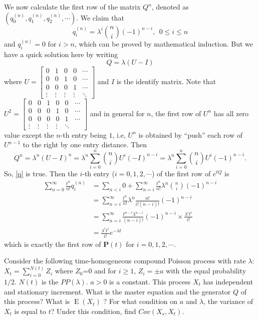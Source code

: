 \documentclass[  11pt]{article}
\newcommand{\e}{ \operatorname{E}}
\newcommand{\Pm}{{\mathbf{P}}}
\begin{document}
\begin{ExerciseList}
We now calculate the first row of the matrix $Q^n$, denoted as
$(q^{(n)}_0,q^{(n)}_1,q^{(n)}_2,\cdots)$. We claim that
\begin{equation}\label{q}
q^{(n)}_i = \lambda^i {n \choose i}(-1)^{n-i}, ~~0\leq i \leq n \tag{$\star$}
\end{equation}
and $q^{(n)}_i=0$  for $ i >n$, which can be proved by mathematical induction. But we have a quick solution here by writing 
\[Q= \lambda(  U-I)\] where $U=\begin{bmatrix}
0 & 1 & 0 & 0 & \cdots \\
0 & 0 & 1 & 0 & \cdots \\
0 & 0 &0&  1  & \cdots \\
\vdots & \vdots & \vdots & \vdots & \ddots
\end{bmatrix}
$ and $I$ is the identify matrix. Note that $U^2=\begin{bmatrix}
0 & 0 & 1 & 0 & 0 & \cdots \\
0 & 0& 0 & 1 & 0&  \cdots \\
0 & 0 & 0&  0  & 1 & \cdots \\
\vdots & \vdots & \vdots & \vdots & \ddots
\end{bmatrix}
$ and in general for $n$, the first row of $U^n$ 
has all zero value except the $n$-th entry being $1$,
i.e, $U^{n}$ is obtained by ``push''  each row of $U^{n-1}$ to the right by one entry distance.
Then 
\[Q^n = \lambda^n ( U-I)^n=  \lambda^ n \sum_{i=0}^n {n \choose i}  U^{i} (-I)^{n-i}=
 \lambda^n  \sum_{i=0}^n {n \choose i}     U^{i} (-1)^{n-i}.\]
So, \eqref{q} is true. Then the $i$-th entry ($i=0,1,2,\cdots$) of the first row of 
$e^{tQ}$ 
is 
\[ \begin{split}
\sum_{n=0}^\infty \frac{t^n}{n!} q^{(n)}_i
&=  \sum_{n<i}  0  + \sum_{n=i}^\infty  \frac{t^n}{n!} \lambda^n {n \choose i}(-1)^{n-i}
\\
&=\sum_{n=i}^\infty \frac{t^n}{n!} \lambda^n \frac{n! }{i!(n-i)!}(-1)^{n-i} 
\\
&=\sum_{n=i}^\infty   \frac  {{t^{n-i}}  \lambda^{n-i}}{(n-i)!}(-1)^{n-i}  \times  \frac{\lambda^i t^i}{i ! }
\\
&= \frac{\lambda^i t^i}{i ! } e^{-\lambda t}
\end{split}
\]
which is exactly the first row of $\Pm(t)$ for $i=0,1,2,\cdots$.


\Exercise
   Consider the following time-homogeneous  compound  Poisson process with rate $\lambda$: 
$X_t = \sum_{i=0}^{N(t)} Z_i$ where $Z_0$=0
and for $i\geq 1$, $Z_i=\pm a$ with the equal probability $1/2$.
$N(t)$ is the $PP(\lambda)$.
$a>0$ is a constant.
This process $X_t$ has independent and stationary increment.
What is the master equation and the generator $Q$ of this process?
What is $\e (X_t)$ ? For what condition on  $a$ and $\lambda$, the variance of 
$X_t$ is equal to $t$? Under this condition,  find $Cov(X_s,X_t)$.


\end{ExerciseList}
\end{document}
